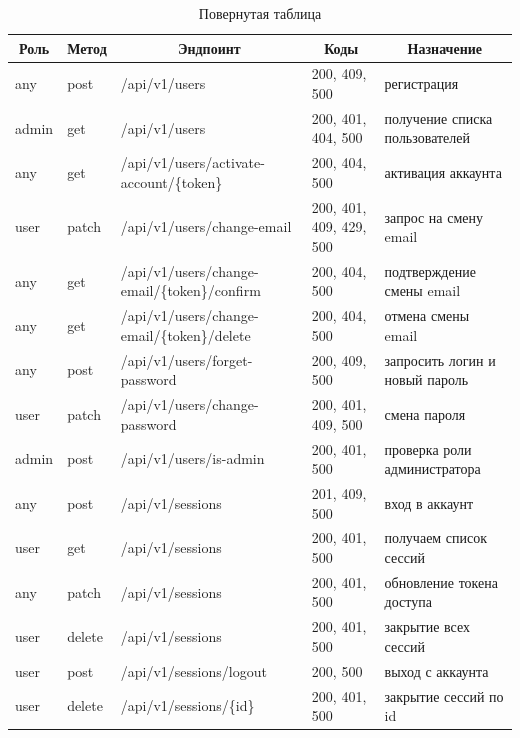 \begin{table}
    \small
    \caption{Повернутая таблица} \label{tabl:swagger}

    \begin{tabular}{|p{1cm}|p{1cm}|p{8.5cm}|p{4.8cm}|p{8.5cm}|}
        \hline
        \multicolumn{1}{|c|}{Роль}
        & \multicolumn{1}{c|}{Метод}
        & \multicolumn{1}{c|}{Эндпоинт}
        & \multicolumn{1}{c|}{Коды}
        & \multicolumn{1}{c|}{Назначение}
        \\ \hline

        any & post & /api/v1/users & 200, 409, 500 & регистрация \\ \hline 
        admin & get & /api/v1/users & 200, 401, 404, 500 & получение списка пользователей \\ \hline 
        any & get & /api/v1/users/activate-account/\{token\} & 200, 404, 500 & активация аккаунта \\ \hline 
        user & patch & /api/v1/users/change-email & 200, 401, 409, 429, 500 & запрос на смену email \\ \hline 
        any & get & /api/v1/users/change-email/\{token\}/confirm & 200, 404, 500 & подтверждение смены email \\ \hline 
        any & get & /api/v1/users/change-email/\{token\}/delete & 200, 404, 500 & отмена смены email \\ \hline 
        any & post & /api/v1/users/forget-password & 200, 409, 500 & запросить логин и новый пароль \\ \hline 
        user & patch & /api/v1/users/change-password & 200, 401, 409, 500 & смена пароля \\ \hline
        admin & post & /api/v1/users/is-admin & 200, 401, 500 & проверка роли администратора\\ \hline 
        any & post & /api/v1/sessions & 201, 409, 500 & вход в аккаунт \\ \hline 
        user & get & /api/v1/sessions & 200, 401, 500 & получаем список сессий \\ \hline 
        any & patch & /api/v1/sessions & 200, 401, 500 & обновление токена доступа \\ \hline 
        user & delete & /api/v1/sessions & 200, 401, 500 & закрытие всех сессий \\ \hline 
        user & post & /api/v1/sessions/logout & 200, 500 & выход с аккаунта \\ \hline 
        user & delete & /api/v1/sessions/\{id\} & 200, 401, 500 & закрытие сессий по id \\ \hline 

\end{tabular}
\end{table}

